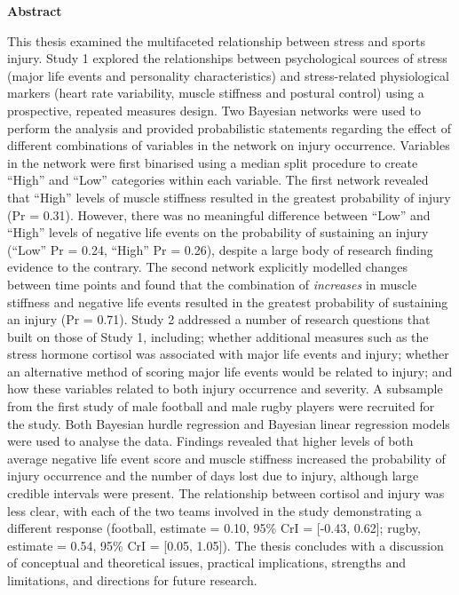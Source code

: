 \documentclass[
  english,
  man,floatsintext]{apa6}
\begin{document}


\clearpage

\begin{center}
\textbf{Abstract}
\end{center}

\bigskip
{}

This thesis examined the multifaceted relationship between stress and sports injury.
Study 1 explored the relationships between psychological sources of stress (major life events and personality characteristics) and stress-related physiological markers (heart rate variability, muscle stiffness and postural control) using a prospective, repeated measures design.
Two Bayesian networks were used to perform the analysis and provided probabilistic statements regarding the effect of different combinations of variables in the network on injury occurrence.
Variables in the network were first binarised using a median split procedure to create \enquote{High} and \enquote{Low} categories within each variable.
The first network revealed that \enquote{High} levels of muscle stiffness resulted in the greatest probability of injury (Pr = 0.31).
However, there was no meaningful difference between \enquote{Low} and \enquote{High} levels of negative life events on the probability of sustaining an injury (\enquote{Low} Pr = 0.24, \enquote{High} Pr = 0.26), despite a large body of research finding evidence to the contrary.
The second network explicitly modelled changes between time points and found that the combination of \emph{increases} in muscle stiffness and negative life events resulted in the greatest probability of sustaining an injury (Pr = 0.71).
Study 2 addressed a number of research questions that built on those of Study 1, including; whether additional measures such as the stress hormone cortisol was associated with major life events and injury; whether an alternative method of scoring major life events would be related to injury; and how these variables related to both injury occurrence and severity.
A subsample from the first study of male football and male rugby players were recruited for the study.
Both Bayesian hurdle regression and Bayesian linear regression models were used to analyse the data.
Findings revealed that higher levels of both average negative life event score and muscle stiffness increased the probability of injury occurrence and the number of days lost due to injury, although large credible intervals were present.
The relationship between cortisol and injury was less clear, with each of the two teams involved in the study demonstrating a different response (football, estimate = 0.10, 95\% CrI = {[}-0.43, 0.62{]}; rugby, estimate = 0.54, 95\% CrI = {[}0.05, 1.05{]}).
The thesis concludes with a discussion of conceptual and theoretical issues, practical implications, strengths and limitations, and directions for future research.
\end{document}
